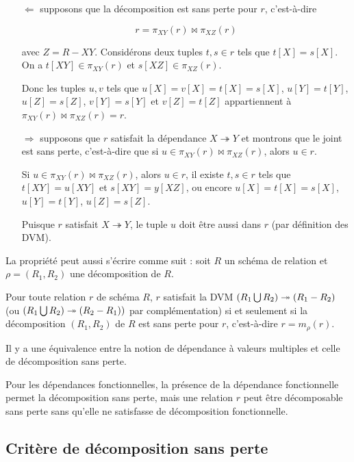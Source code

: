 		\begin{itemize}
			\item[$\Leftarrow$] supposons que la décomposition est sans perte pour $r$, c'est-à-dire
			
			$$r = \pi_{XY}(r) \Join \pi_{XZ}(r)$$
			
			avec $Z = R - XY$. Considérons deux tuples $t, s \in r$ tels que $t[X] = s[X]$. On a $t[XY] \in \pi_{XY}(r)$ et $s[XZ] \in \pi_{XZ}(r)$.
			
			Donc les tuples $u, v$ tels que $u[X] = v[X] = t[X] = s[X]$, $u[Y] = t[Y]$, $u[Z] = s[Z]$, $v[Y] = s[Y]$ et $v[Z] = t[Z]$ appartiennent à $\pi_{XY}(r) \Join \pi_{XZ}(r) = r$.
			
			\item[$\Rightarrow$] supposons que $r$ satisfait la dépendance $X \twoheadrightarrow  Y$ et montrons que le joint est sans perte, c'est-à-dire que si $u \in \pi_{XY}(r) \Join \pi_{XZ}(r)$, alors $u \in r$.
			
			Si $u \in \pi_{XY}(r) \Join \pi_{XZ}(r)$, alors $u \in r$, il existe $t, s \in r$ tels que $t[XY] = u[XY]$ et $s[XY] = y[XZ]$, ou encore $u[X] = t[X] = s[X]$, $u[Y] = t[Y]$, $u[Z] = s[Z]$.
			
			
			Puisque $r$ satisfait $X \twoheadrightarrow Y$, le tuple $u$ doit être aussi dans $r$ (par définition des DVM).
			
		\end{itemize}
	
		La propriété peut aussi s'écrire comme suit : soit $R$ un schéma de relation et $\rho = (R_1, R_2)$ une décomposition de $R$.
		
		 Pour toute relation $r$ de schéma $R$, $r$ satisfait la DVM $(R_1 \bigcup R_2) \twoheadrightarrow (R_1 - R_2)$ (ou $(R_1 \bigcup R_2) \twoheadrightarrow (R_2 - R_1))$ par complémentation) si et seulement si la décomposition $(R_1, R_2)$  de $R$ est sans perte pour $r$, c'est-à-dire $r = m_\rho (r)$.
		 
		 Il y a une équivalence entre la notion de dépendance à valeurs multiples et celle de décomposition sans perte.
		 
		 Pour les dépendances fonctionnelles, la présence de la dépendance fonctionnelle permet la décomposition sans perte, mais une relation $r$ peut être décomposable sans perte sans qu'elle ne satisfasse de décomposition fonctionnelle.
		 
		 
		 \subsection{Critère de décomposition sans perte}
		 

